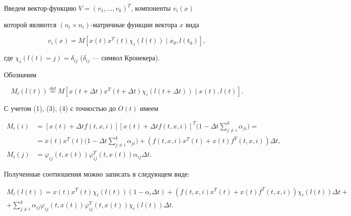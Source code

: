 Введем вектор-функцию $V=(v_1,\dotsc,v_k)^T$, компоненты $v_i(x)$ 


которой являются $(n_i\times n_i)$-матричные функции вектора $x$ вида 


\begin{equation} 


v_i(x)=M[x(t)x^T(t)\chi_i(l(t))\mid x_0,l(t_0)], 


\end{equation} 


где $\chi_i(l(t)=j)=\delta_{ij}$ ($\delta_{ij}$ --- символ Кронекера). 


Обозначим 


$$ 


M_i(l(t))\overset{\text{def}}{=}{} 


M[x(t+\Delta t)x^T(t+\Delta t)\chi_i 


(l(t+\Delta t))\mid x(t),l(t)]. 


$$ 


С учетом (1), (3), (4) с точностью до $O(t)$ имеем  


\begin{align*} 


M_i(i)&=[x(t)+\Delta t f(t,x,i)][x(t)+\Delta t f(t,x,i)]^T 


\bigg(1-\Delta t\sum^k_{j\ne i}\alpha_{ji}\bigg)= \\ 


&=x(t)x^T(t)\bigg(1-\Delta t\sum^k_{j\ne i}\alpha_{ji}\bigg) 


+(f(t,x,i)x^T(t)+x(t)f^T(t,x,i))\Delta t, \\ 


M_i(j)&=\varphi_{ij}(t,x(t))\varphi^T_{ij} 


(t,x(t))\alpha_{ij}\Delta t. 


\end{align*} 


Полученные соотношения можно записать в следующем виде: 


\begin{multline*} 


M_i(l(t))=x(t)x^T(t)\chi_i(l(t))(1-\alpha_i\Delta t) 


+(f(t,x,i)x^T(t)+x(t)f^T(t,x,i))\chi_i(l(t))\Delta t+\\ 


% 


+\sum^k_{j\ne i}\alpha_{ij}\varphi_{ij}(t,x(t)) 


\varphi^T_{ij}(t,x(t))\chi_i(l(t))\Delta t. 


\end{multline*} 


